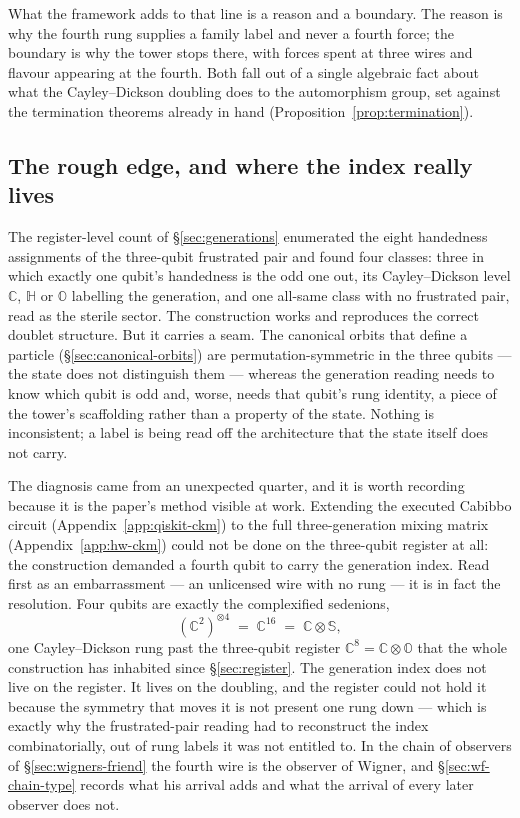 What the framework adds to that line is a reason and a boundary. The reason is why the fourth rung
supplies a family label and never a fourth force; the boundary is why the tower stops there, with
forces spent at three wires and flavour appearing at the fourth. Both fall out of a single algebraic
fact about what the Cayley--Dickson doubling does to the automorphism group, set against the
termination theorems already in hand (Proposition~\ref{prop:termination}).

\subsection{The rough edge, and where the index really lives}
\label{sec:sedenions-roughedge}

The register-level count of \S\ref{sec:generations} enumerated the eight handedness assignments of
the three-qubit frustrated pair and found four classes: three in which exactly one qubit's
handedness is the odd one out, its Cayley--Dickson level $\mathbb{C}$, $\mathbb{H}$ or $\mathbb{O}$
labelling the generation, and one all-same class with no frustrated pair, read as the sterile
sector. The construction works and reproduces the correct doublet structure. But it carries a seam.
The canonical orbits that define a particle (\S\ref{sec:canonical-orbits}) are permutation-symmetric
in the three qubits --- the state does not distinguish them --- whereas the generation reading needs
to know which qubit is odd and, worse, needs that qubit's rung identity, a piece of the tower's
scaffolding rather than a property of the state. Nothing is inconsistent; a label is being read off
the architecture that the state itself does not carry.

The diagnosis came from an unexpected quarter, and it is worth recording because it is the paper's
method visible at work. Extending the executed Cabibbo circuit (Appendix~\ref{app:qiskit-ckm}) to
the full three-generation mixing matrix (Appendix~\ref{app:hw-ckm}) could not be done on the
three-qubit register at all: the construction demanded a fourth qubit to carry the generation index.
Read first as an embarrassment --- an unlicensed wire with no rung --- it is in fact the resolution.
Four qubits are exactly the complexified sedenions,
\begin{equation}
  (\mathbb{C}^{2})^{\otimes 4} \;=\; \mathbb{C}^{16} \;=\; \mathbb{C}\otimes\mathbb{S},
  \label{eq:four-qubit-sedenion}
\end{equation}
one Cayley--Dickson rung past the three-qubit register $\mathbb{C}^{8} = \mathbb{C}\otimes\mathbb{O}$
that the whole construction has inhabited since \S\ref{sec:register}. The generation index does not
live on the register. It lives on the doubling, and the register could not hold it because the
symmetry that moves it is not present one rung down --- which is exactly why the frustrated-pair
reading had to reconstruct the index combinatorially, out of rung labels it was not entitled to. In
the chain of observers of \S\ref{sec:wigners-friend} the fourth wire is the observer of Wigner, and
\S\ref{sec:wf-chain-type} records what his arrival adds and what the arrival of every later observer
does not.

